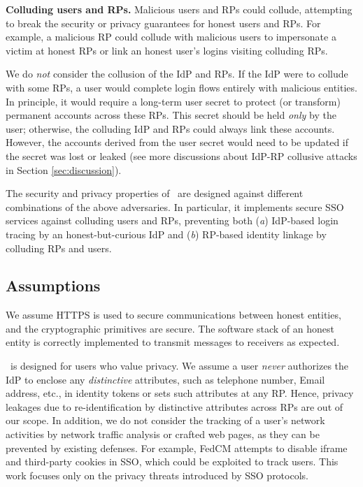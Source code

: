 \noindent \textbf{Colluding users and RPs.}
Malicious users and RPs could collude,
 attempting to break the security or privacy guarantees for honest users and RPs.
For example, a malicious RP could collude with malicious users to %
 impersonate a victim at honest RPs or link an honest user's logins visiting colluding RPs.

We do \emph{not} consider the collusion of the IdP and RPs.
If the IdP were to collude with some RPs, a user would complete login flows entirely with malicious entities.
In principle, it would require a long-term user secret to protect (or transform) permanent accounts across these RPs.
This secret should be held \emph{only} by the user; otherwise, the colluding IdP and RPs could always link these accounts.
However, the accounts derived from the user secret would need to be updated if the secret was lost or leaked (see more discussions about IdP-RP collusive attacks in Section \ref{sec:discussion}).

\newc
The security and privacy properties of \usso\ are designed against different combinations of the above adversaries.
In particular, it implements secure SSO services against colluding users and RPs,
        preventing both (\emph{a}) IdP-based login tracing by an honest-but-curious IdP
            and (\emph{b}) RP-based identity linkage by colluding RPs and users.
\oldc

\subsection{Assumptions}
We assume HTTPS is used to secure communications between honest entities, and the cryptographic primitives are secure. The software stack of an honest entity is correctly implemented to transmit messages to receivers as expected.

\usso\ is designed for users who value privacy. We assume a user \emph{never} authorizes the IdP to enclose any \emph{distinctive} attributes, such as telephone number, Email address, etc., in identity tokens or sets such attributes at any RP. Hence, privacy leakages due to re-identification by distinctive attributes across RPs are out of our scope.
In addition, we do not consider the tracking of a user's network activities by network traffic analysis or crafted web pages, as they can be prevented by existing defenses. \newc
For example, FedCM \cite{FedCM} attempts to disable iframe and third-party cookies in SSO, which could be exploited to track users. This work focuses only on the privacy threats introduced by SSO protocols.

\oldc


